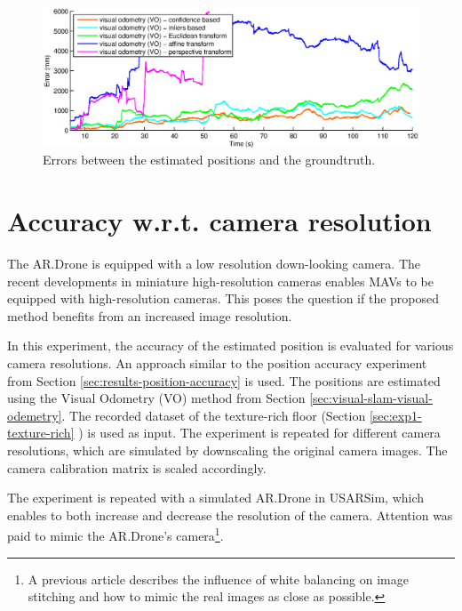 \begin{figure}[htb!]
\centering
\includegraphics[width=\linewidth]{images/exp4-transform-error.eps}
\caption{Errors between the estimated positions and the groundtruth.}
\label{fig:exp4-transform-error}
\end{figure}





\clearpage
\section{Accuracy w.r.t. camera resolution}
\label{sec:res-cam-resolution}
The AR.Drone is equipped with a low resolution down-looking camera.
The recent developments in miniature high-resolution cameras enables MAVs to be equipped with high-resolution cameras.
This poses the question if the proposed method benefits from an increased image resolution.

In this experiment, the accuracy of the estimated position is evaluated for various camera resolutions.
An approach similar to the position accuracy experiment from Section \ref{sec:results-position-accuracy} is used.
The positions are estimated using the Visual Odometry (VO) method from Section \ref{sec:visual-slam-visual-odemetry}.
The recorded dataset of the texture-rich floor (Section \ref{sec:exp1-texture-rich} ) is used as input.
The experiment is repeated for different camera resolutions, which are simulated by downscaling the original camera images.
The camera calibration matrix is scaled accordingly.

The experiment is repeated with a simulated AR.Drone in USARSim, which enables to both increase and decrease the resolution of the camera.
Attention was paid to mimic the AR.Drone's camera\footnote{A previous article \cite{Visser2011imav} describes the influence of white balancing on image stitching and how to mimic the real images as close as possible.}.

